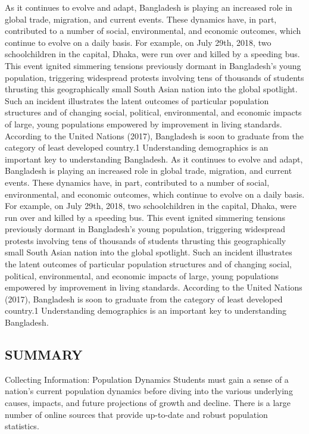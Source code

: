 \documentclass[a4paper,12pt]{article}
\begin{document}
As it continues to evolve and adapt, Bangladesh is playing an increased role in global trade, migration, and current events. These dynamics have, in part, contributed to a number of social, environmental, and economic outcomes, which continue to evolve on a daily basis. For example, on July 29th, 2018, two schoolchildren in the capital, Dhaka, were run over and killed by a speeding bus. This event ignited simmering tensions previously dormant in Bangladesh’s young population, triggering widespread protests involving tens of thousands of students thrusting this geographically small South Asian nation into the global spotlight. Such an incident illustrates the latent outcomes of particular population structures and of changing social, political, environmental, and economic impacts of large, young populations empowered by improvement in living standards. According to the United Nations (2017), Bangladesh is soon to graduate from the category of least developed country.1 Understanding demographics is an important key to understanding Bangladesh. \newline
As it continues to evolve and adapt, Bangladesh is playing an increased role in global trade, migration, and current events. These dynamics have, in part, contributed to a number of social, environmental, and economic outcomes, which continue to evolve on a daily basis. For example, on July 29th, 2018, two schoolchildren in the capital, Dhaka, were run over and killed by a speeding bus. This event ignited simmering tensions previously dormant in Bangladesh’s young population, triggering widespread protests involving tens of thousands of students thrusting this geographically small South Asian nation into the global spotlight. Such an incident illustrates the latent outcomes of particular population structures and of changing social, political, environmental, and economic impacts of large, young populations empowered by improvement in living standards. According to the United Nations (2017), Bangladesh is soon to graduate from the category of least developed country.1 Understanding demographics is an important key to understanding Bangladesh.
\subsection{SUMMARY}
Collecting Information: Population Dynamics
Students must gain a sense of a nation’s current population dynamics before diving into the various underlying causes, impacts, and future projections of growth and decline. There is a large number of online sources that provide up-to-date and robust population statistics. \newline
\end{document}
